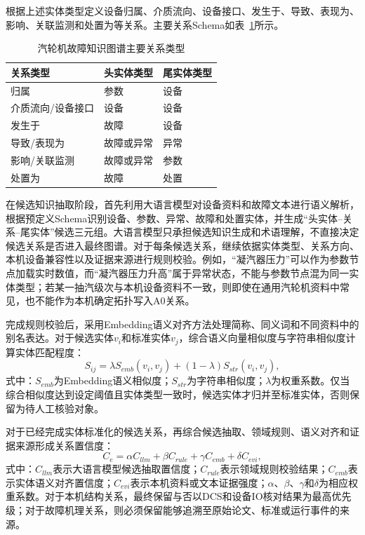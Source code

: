 根据上述实体类型定义设备归属、介质流向、设备接口、发生于、导致、表现为、影响、关联监测和处置为等关系。主要关系Schema如表~\ref{tab:kg_relation_types_v5}所示。

\begin{table}[htbp]
    \centering
    \caption{汽轮机故障知识图谱主要关系类型}
    \label{tab:kg_relation_types_v5}
    \begin{tabular}{lll}
        \toprule
        关系类型 & 头实体类型 & 尾实体类型 \\
        \midrule
        归属 & 参数 & 设备 \\
        介质流向/设备接口 & 设备 & 设备 \\
        发生于 & 故障 & 设备 \\
        导致/表现为 & 故障或异常 & 异常 \\
        影响/关联监测 & 故障或异常 & 参数 \\
        处置为 & 故障 & 处置 \\
        \bottomrule
    \end{tabular}
\end{table}

在候选知识抽取阶段，首先利用大语言模型对设备资料和故障文本进行语义解析，根据预定义Schema识别设备、参数、异常、故障和处置实体，并生成“头实体--关系--尾实体”候选三元组。大语言模型只承担候选知识生成和术语理解，不直接决定候选关系是否进入最终图谱。对于每条候选关系，继续依据实体类型、关系方向、本机设备兼容性以及证据来源进行规则校验。例如，“凝汽器压力”可以作为参数节点加载实时数值，而“凝汽器压力升高”属于异常状态，不能与参数节点混为同一实体类型；若某一抽汽级次与本机设备资料不一致，则即使在通用汽轮机资料中常见，也不能作为本机确定拓扑写入A0关系。

完成规则校验后，采用Embedding语义对齐方法处理简称、同义词和不同资料中的别名表达\cite{Reimers2019SentenceBERT}。对于候选实体$v_i$和标准实体$v_j$，综合语义向量相似度与字符串相似度计算实体匹配程度：
\begin{equation}
S_{ij}=\lambda S_{emb}(v_i,v_j)+(1-\lambda)S_{str}(v_i,v_j),
\end{equation}
式中：$S_{emb}$为Embedding语义相似度；$S_{str}$为字符串相似度；$\lambda$为权重系数。仅当综合相似度达到设定阈值且实体类型一致时，候选实体才归并至标准实体，否则保留为待人工核验对象。

对于已经完成实体标准化的候选关系，再综合候选抽取、领域规则、语义对齐和证据来源形成关系置信度：
\begin{equation}
C_e=\alpha C_{llm}+\beta C_{rule}+\gamma C_{emb}+\delta C_{evi},
\end{equation}
式中：$C_{llm}$表示大语言模型候选抽取置信度；$C_{rule}$表示领域规则校验结果；$C_{emb}$表示实体语义对齐置信度；$C_{evi}$表示本机资料或文本证据强度；$\alpha$、$\beta$、$\gamma$和$\delta$为相应权重系数。对于本机结构关系，最终保留与否以DCS和设备IO核对结果为最高优先级；对于故障机理关系，则必须保留能够追溯至原始论文、标准或运行事件的来源。

